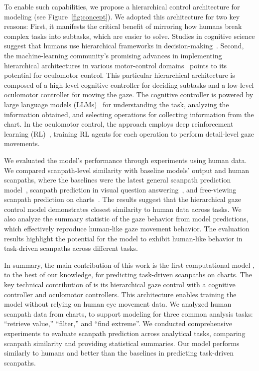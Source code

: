 To enable such capabilities, we propose a hierarchical control architecture for modeling (see Figure~\ref{fig:concept}).
We adopted this architecture for two key reasons:
First, it manifests the critical benefit of mirroring how humans break complex tasks into subtasks, which are easier to solve. Studies in cognitive science suggest that humans use hierarchical frameworks in decision-making~\cite{botvinick2012hierarchical, frank2012mechanisms}.
Second, the machine-learning community's promising advances in implementing hierarchical architectures in various motor-control domains~\cite{huang2023inner, brohan2023can} points to its potential for oculomotor control.
This particular hierarchical architecture is composed of a high-level cognitive controller for deciding subtasks and a low-level oculomotor controller for moving the gaze.
The cognitive controller is powered by large language models (LLMs)~\cite{achiam2023gpt} for understanding the task, analyzing the information obtained, and selecting operations for collecting information from the chart.
In the oculomotor control, the approach employs deep reinforcement learning (RL)~\cite{schulman2017proximal}, training RL agents for each operation to perform detail-level gaze movements.

We evaluated the model's performance through experiments using human data. 
We compared scanpath-level similarity with baseline models' output and human scanpaths, where the baselines were the latest general scanpath prediction model~\cite{kummerer2022deepgaze}, scanpath prediction in visual question answering~\cite{chen2021predicting}, and free-viewing scanpath prediction on charts~\cite{wang2023scanpath}. The results suggest that the hierarchical gaze control model demonstrates closest similarity to human data across tasks.
We also analyze the summary statistic of the gaze behavior from model predictions, which effectively reproduce human-like gaze movement behavior.
The evaluation results highlight the potential for the model to exhibit human-like behavior in task-driven scanpaths across different tasks.

In summary, the main contribution of this work is the first computational model \name, to the best of our knowledge, for predicting task-driven scanpaths on charts. The key technical contribution of \name is its hierarchical gaze control with a cognitive controller and oculomotor controllers. This architecture enables training the model without relying on human eye movement data.
We analyzed human scanpath data from charts, to support modeling for three common analysis tasks: ``retrieve value,'' ``filter,'' and ``find extreme''.
We conducted comprehensive experiments to evaluate scanpath prediction across analytical tasks, comparing scanpath similarity and providing statistical summaries. Our model performs similarly to humans and better than the baselines in predicting task-driven scanpaths.

